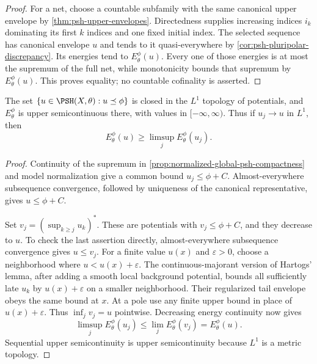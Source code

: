 \begin{proof}
For a net, choose a countable subfamily with the same canonical upper envelope by \cref{thm:psh-upper-envelopes}. Directedness supplies increasing indices $i_k$ dominating its first $k$ indices and one fixed initial index. The selected sequence has canonical envelope $u$ and tends to it quasi-everywhere by \cref{cor:psh-pluripolar-discrepancy}. Its energies tend to $E_\theta^\phi(u)$. Every one of those energies is at most the supremum of the full net, while monotonicity bounds that supremum by $E_\theta^\phi(u)$. This proves equality; no countable cofinality is asserted.
\end{proof}

\begin{proposition}\label{prop:relative-energy-lone-upper-semicontinuity}
The set $\{u\in\PSH(X,\theta):u\preceq\phi\}$ is closed in the $L^1$ topology of potentials, and $E_\theta^\phi$ is upper semicontinuous there, with values in $[-\infty,\infty)$. Thus if $u_j\to u$ in $L^1$, then
\[
 E_\theta^\phi(u)\geq\limsup_j E_\theta^\phi(u_j).
\]
\end{proposition}
\begin{proof}
Continuity of the supremum in \cref{prop:normalized-global-psh-compactness} and model normalization give a common bound $u_j\leq\phi+C$. Almost-everywhere subsequence convergence, followed by uniqueness of the canonical representative, gives $u\leq\phi+C$.

Set $v_j=(\sup_{k\geq j}u_k)^*$. These are potentials with $v_j\leq\phi+C$, and they decrease to $u$. To check the last assertion directly, almost-everywhere subsequence convergence gives $u\leq v_j$. For a finite value $u(x)$ and $\varepsilon>0$, choose a neighborhood where $u<u(x)+\varepsilon$. The continuous-majorant version of Hartogs' lemma, after adding a smooth local background potential, bounds all sufficiently late $u_k$ by $u(x)+\varepsilon$ on a smaller neighborhood. Their regularized tail envelope obeys the same bound at $x$. At a pole use any finite upper bound in place of $u(x)+\varepsilon$. Thus $\inf_jv_j=u$ pointwise. Decreasing energy continuity now gives
\[
 \limsup_j E_\theta^\phi(u_j)
       \leq\lim_jE_\theta^\phi(v_j)=E_\theta^\phi(u).
\]
Sequential upper semicontinuity is upper semicontinuity because $L^1$ is a metric topology.
\end{proof}

